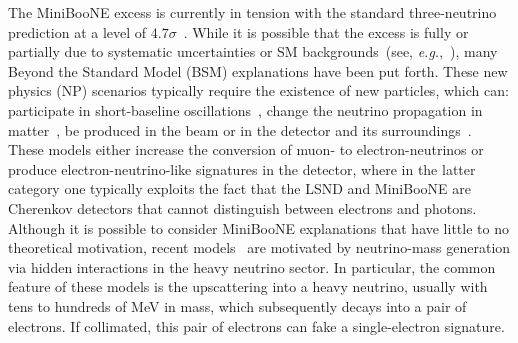 The MiniBooNE excess is currently in tension with the standard three-neutrino prediction at a level of $4.7 \sigma$~\cite{Aguilar-Arevalo:2018gpe}. While it is possible that the excess is fully or partially due to systematic uncertainties or SM backgrounds~(see, \textit{e.g.},~\cite{AguilarArevalo:2008rc,Aguilar-Arevalo:2012fmn,Hill:2010zy}), many Beyond the Standard Model (BSM) explanations have been put forth. These new physics (NP) scenarios typically require the existence of new particles, which can: participate in short-baseline oscillations~\cite{Murayama:2000hm,Strumia:2002fw,  Barenboim:2002ah, GonzalezGarcia:2003jq, Barger:2003xm,Sorel:2003hf, Barenboim:2004wu, Zurek:2004vd, Kaplan:2004dq, Pas:2005rb, deGouvea:2006qd,Schwetz:2007cd, Farzan:2008zv, Hollenberg:2009ws,Nelson:2010hz, Akhmedov:2010vy, Diaz:2010ft, Bai:2015ztj, Giunti:2015mwa, Liao:2016reh, Papoulias:2016edm, Moss:2017pur, Carena:2017qhd}, change the neutrino propagation in matter~\cite{Liao:2016reh, Liao:2018mbg,Asaadi:2017bhx,Doring:2018cob}, be produced in the beam or in the detector and its surroundings~\cite{Gninenko:2009ks,Gninenko:2010pr,Dib:2011jh,McKeen:2010rx,Masip:2012ke, Masip:2011qb,Gninenko:2012rw,Magill:2018jla}. These models either increase the conversion of muon- to electron-neutrinos or produce electron-neutrino-like signatures in the detector, where in the latter category one typically exploits the fact that the LSND and MiniBooNE are Cherenkov detectors that cannot distinguish between electrons and photons. Although it is possible to consider MiniBooNE explanations that have little to no theoretical motivation, recent models~\cite{Bertuzzo:2018itn,Bertuzzo:2018ftf,Ballett:2018ynz} are motivated by neutrino-mass generation via hidden interactions in the heavy neutrino sector. In particular, the common feature of these models is the upscattering into a heavy neutrino, usually with tens to hundreds of MeV in mass, which subsequently decays into a pair of electrons. If collimated, this pair of electrons can fake a single-electron signature.

